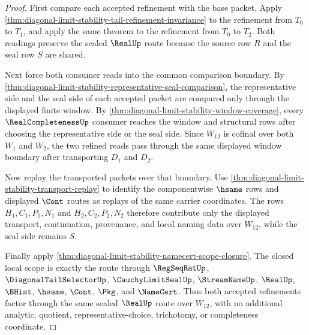 \begin{proof}
First compare each accepted refinement with the base packet. Apply \autoref{thm:diagonal-limit-stability-tail-refinement-invariance} to the refinement from $T_0$ to $T_1$, and apply the same theorem to the refinement from $T_0$ to $T_2$. Both readings preserve the sealed $\RealUp$ route because the source row $R$ and the seal row $S$ are shared.

Next force both consumer reads into the common comparison boundary. By \autoref{thm:diagonal-limit-stability-representative-seal-comparison}, the representative side and the seal side of each accepted packet are compared only through the displayed finite window. By \autoref{thm:diagonal-limit-stability-window-coverage}, every $\RealCompletenessUp$ consumer reaches the window and structural rows after choosing the representative side or the seal side. Since $W_{12}$ is cofinal over both $W_1$ and $W_2$, the two refined reads pass through the same displayed window boundary after transporting $D_1$ and $D_2$.

Now replay the transported packets over that boundary. Use \autoref{thm:diagonal-limit-stability-transport-replay} to identify the componentwise $\hsame$ rows and displayed $\Cont$ routes as replays of the same carrier coordinates. The rows $H_1,C_1,P_1,N_1$ and $H_2,C_2,P_2,N_2$ therefore contribute only the displayed transport, continuation, provenance, and local naming data over $W_{12}$, while the seal side remains $S$.

Finally apply \autoref{thm:diagonal-limit-stability-namecert-scope-closure}. The closed local scope is exactly the route through $\RegSeqRatUp$, $\DiagonalTailSelectorUp$, $\CauchyLimitSealUp$, $\StreamNameUp$, $\RealUp$, $\BHist$, $\hsame$, $\Cont$, $\Pkg$, and $\NameCert$. Thus both accepted refinements factor through the same sealed $\RealUp$ route over $W_{12}$, with no additional analytic, quotient, representative-choice, trichotomy, or completeness coordinate.
\end{proof}

